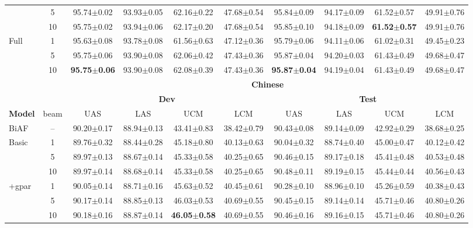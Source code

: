 \documentclass[11pt,a4paper]{article}
\begin{document}
\begin{table*}[h]
{\begin{tabular}[t]{l|c|cccc|cccc}
& 5 & 95.74$\pm$0.02 & 93.93$\pm$0.05 & 62.16$\pm$0.22 & 47.68$\pm$0.54 & 95.84$\pm$0.09 & 94.17$\pm$0.09 & 61.52$\pm$0.57 & 49.91$\pm$0.76 \\
& 10 & 95.75$\pm$0.02 & 93.94$\pm$0.06 & 62.17$\pm$0.20 & 47.68$\pm$0.54 & 95.85$\pm$0.10 & 94.18$\pm$0.09 & \textbf{61.52$\pm$0.57} & 49.91$\pm$0.76 \\
\hline
\multirow{3}{*}{\textsf{Full}} & 1 & 95.63$\pm$0.08 & 93.78$\pm$0.08 & 61.56$\pm$0.63 & 47.12$\pm$0.36 & 95.79$\pm$0.06 & 94.11$\pm$0.06 & 61.02$\pm$0.31 & 49.45$\pm$0.23 \\
& 5 & 95.75$\pm$0.06 & 93.90$\pm$0.08 & 62.06$\pm$0.42 & 47.43$\pm$0.36 & 95.87$\pm$0.04 & 94.20$\pm$0.03 & 61.43$\pm$0.49 & 49.68$\pm$0.47 \\
& 10 & \textbf{95.75$\pm$0.06} & 93.90$\pm$0.08 & 62.08$\pm$0.39 & 47.43$\pm$0.36 & \textbf{95.87$\pm$0.04} & 94.19$\pm$0.04 & 61.43$\pm$0.49 & 49.68$\pm$0.47 \\
\hline
& & \multicolumn{8}{c}{\textbf{Chinese}} \\
\cline{3-10}
& & \multicolumn{4}{c|}{\textbf{Dev}} & \multicolumn{4}{c}{\textbf{Test}} \\
\cline{3-10}
\textbf{Model} & beam & UAS & LAS & UCM & LCM & UAS & LAS & UCM & LCM \\
\hline
BiAF & -- & 90.20$\pm$0.17 & 88.94$\pm$0.13 & 43.41$\pm$0.83 & 38.42$\pm$0.79 & 90.43$\pm$0.08 & 89.14$\pm$0.09 & 42.92$\pm$0.29 & 38.68$\pm$0.25 \\
\hline
\hline
\multirow{3}{*}{\textsf{Basic}} & 1 & 89.76$\pm$0.32 & 88.44$\pm$0.28 & 45.18$\pm$0.80 & 40.13$\pm$0.63 & 90.04$\pm$0.32 & 88.74$\pm$0.40 & 45.00$\pm$0.47 & 40.12$\pm$0.42 \\
& 5 & 89.97$\pm$0.13 & 88.67$\pm$0.14 & 45.33$\pm$0.58 & 40.25$\pm$0.65 & 90.46$\pm$0.15 & 89.17$\pm$0.18 & 45.41$\pm$0.48 & 40.53$\pm$0.48 \\
& 10 & 89.97$\pm$0.14 & 88.68$\pm$0.14 & 45.33$\pm$0.58 & 40.25$\pm$0.65 & 90.48$\pm$0.11 & 89.19$\pm$0.15 & 45.44$\pm$0.44 & 40.56$\pm$0.43 \\
\hline
\multirow{3}{*}{\textsf{+gpar}} & 1 & 90.05$\pm$0.14 & 88.71$\pm$0.16 & 45.63$\pm$0.52 & 40.45$\pm$0.61 & 90.28$\pm$0.10 & 88.96$\pm$0.10 & 45.26$\pm$0.59 & 40.38$\pm$0.43 \\
& 5 & 90.17$\pm$0.14 & 88.85$\pm$0.13 & 46.03$\pm$0.53 & 40.69$\pm$0.55 & 90.45$\pm$0.15 & 89.14$\pm$0.14 & 45.71$\pm$0.46 & 40.80$\pm$0.26 \\
& 10 & 90.18$\pm$0.16 & 88.87$\pm$0.14 & \textbf{46.05$\pm$0.58} & 40.69$\pm$0.55 & 90.46$\pm$0.16 & 89.16$\pm$0.15 & 45.71$\pm$0.46 & 40.80$\pm$0.26 \\

\end{tabular}}
\end{table*}
\end{document}
